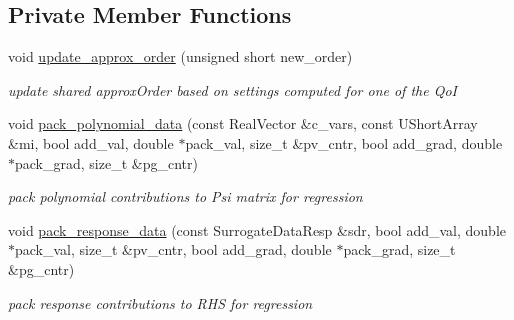 \subsection*{Private Member Functions}
\begin{DoxyCompactItemize}
\item 
void \hyperlink{classPecos_1_1SharedRegressOrthogPolyApproxData_af832d8d1737ee25aab2bcf43bb118bad}{update\+\_\+approx\+\_\+order} (unsigned short new\+\_\+order)\label{classPecos_1_1SharedRegressOrthogPolyApproxData_af832d8d1737ee25aab2bcf43bb118bad}

\begin{DoxyCompactList}\small\item\em update shared approx\+Order based on settings computed for one of the QoI \end{DoxyCompactList}\item 
void \hyperlink{classPecos_1_1SharedRegressOrthogPolyApproxData_aa0ea4856f4fb129a10c9f46f9b703e43}{pack\+\_\+polynomial\+\_\+data} (const Real\+Vector \&c\+\_\+vars, const U\+Short\+Array \&mi, bool add\+\_\+val, double $\ast$pack\+\_\+val, size\+\_\+t \&pv\+\_\+cntr, bool add\+\_\+grad, double $\ast$pack\+\_\+grad, size\+\_\+t \&pg\+\_\+cntr)\label{classPecos_1_1SharedRegressOrthogPolyApproxData_aa0ea4856f4fb129a10c9f46f9b703e43}

\begin{DoxyCompactList}\small\item\em pack polynomial contributions to Psi matrix for regression \end{DoxyCompactList}\item 
void \hyperlink{classPecos_1_1SharedRegressOrthogPolyApproxData_a3ff730d25db57edaded2ddabc79e4137}{pack\+\_\+response\+\_\+data} (const Surrogate\+Data\+Resp \&sdr, bool add\+\_\+val, double $\ast$pack\+\_\+val, size\+\_\+t \&pv\+\_\+cntr, bool add\+\_\+grad, double $\ast$pack\+\_\+grad, size\+\_\+t \&pg\+\_\+cntr)\label{classPecos_1_1SharedRegressOrthogPolyApproxData_a3ff730d25db57edaded2ddabc79e4137}

\begin{DoxyCompactList}\small\item\em pack response contributions to R\+HS for regression \end{DoxyCompactList}\end{DoxyCompactItemize}

